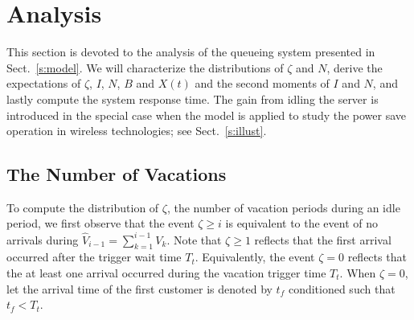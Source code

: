 \documentclass[journal]{IEEEtran}
\begin{document}
\section{Analysis}
\label{s:ana}
This section is devoted to the analysis of the queueing system presented in Sect.~\ref{s:model}. We will characterize the distributions of $\zeta$ and $N$, derive the expectations of $\zeta$, $I$, $N$, $B$ and $X(t)$ and the second moments of $I$ and $N$, and lastly compute the system response time. The gain from idling the server is introduced in the special case when the model is applied to study the power save operation in wireless technologies; see Sect.~\ref{s:illust}.

\subsection{The Number of Vacations}
To compute the distribution of $\zeta$, the number of vacation periods during an idle period, we first observe that the event $\zeta\geq i$ is equivalent to the event of no arrivals during $\hat V_{i-1}=\sum_{k=1}^{i-1}V_k$. Note that $\zeta \geq 1$ reflects that the first arrival occurred after the trigger wait time $T_t$. Equivalently, the event $\zeta=0$ reflects that the at least one arrival occurred during the vacation trigger time $T_t$. When $\zeta=0$, let the arrival time of the first customer is denoted by $t_f$
conditioned such that $t_f<T_t$. 
\end{document}
